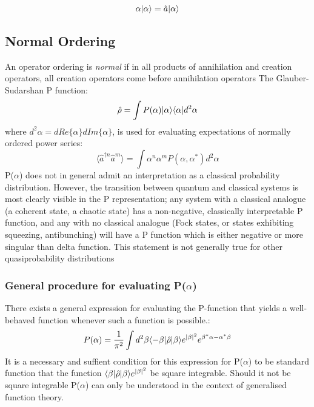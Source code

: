 \begin{equation}
\alpha | \alpha \rangle = \hat{a} | \alpha \rangle
\end{equation}
\subsection{Normal Ordering}

An operator ordering is \emph{normal} if in all products of annihilation and creation operators, all creation operators come before annihilation operators \autocite{Mandl2010} The Glauber-Sudarshan P function\autocite{Cahill1969}:
\begin{equation}
	\hat{\rho} = \int P(\alpha) | \alpha \rangle \langle \alpha | d^2 \alpha
	\end{equation}
where $d^2 \alpha = dRe\{\alpha\}dIm\{\alpha\}$, is used for evaluating expectations of normally ordered power series:
\begin{equation}
	\langle \hat{a}^{\dagger n} \hat{a}^{m}  \rangle = \int \alpha^n \alpha^m P (\alpha, \alpha^*) d^2 \alpha
\end{equation}
P($\alpha$) does not in general admit an interpretation as a classical probability distribution. However, the transition between quantum and classical systems is most clearly visible in the P representation; any system with a classical analogue (a coherent state, a chaotic state) has a non-negative, classically interpretable P function, and any with no classical analogue (Fock states, or states exhibiting squeezing, antibunching) will have a P function which is either negative or more singular than delta function. This statement is not generally true for other quasiprobability distributions\autocite{Mandel1995}

\subsubsection{General procedure for evaluating P($\alpha$)}
\label{mehta}

There exists a general expression for evaluating the P-function that yields a well-behaved function whenever such a function is possible.\autocite{Mehta1967}:
\begin{equation}
	P(\alpha) = \frac{1}{\pi^2} \int d^2 \beta \langle -\beta | \hat{\rho} | \beta \rangle e^{|\beta|^2} e^{\beta^* \alpha -\alpha^* \beta}
\end{equation}
It is a necessary and suffient condition for this expression for P($\alpha$) to be standard function that the function $ \langle \beta | \hat{\rho} | \beta \rangle e^{|\beta|^2} $ be square integrable. Should it not be square integrable P($\alpha$) can only be understood in the context of generalised function theory.


